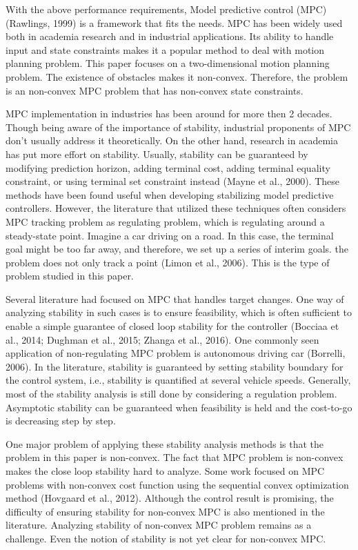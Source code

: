 \documentclass{ifacconf}
\begin{document}
With the above performance requirements, Model predictive control (MPC) (Rawlings, 1999) is a framework that fits the needs. MPC has been widely used both in academia research and in industrial applications. Its ability to handle input and state constraints makes it a popular method to deal with motion planning problem. 
This paper focuses on a two-dimensional motion planning problem. %
The existence of obstacles makes it non-convex. Therefore, the problem is an non-convex MPC problem that has non-convex state constraints. 

MPC implementation in industries has been around for more then 2 decades. Though being aware of the importance of stability, industrial proponents of MPC don't usually address it theoretically. On the other hand, research in academia has put more effort on stability. Usually, stability can be guaranteed by modifying prediction horizon, adding terminal cost, adding terminal equality constraint, or using terminal set constraint instead (Mayne et al., 2000). These methods have been found useful when developing stabilizing model predictive controllers. However, the literature that utilized these techniques often considers MPC tracking problem as regulating problem, which is regulating around a steady-state point. Imagine a car driving on a road. In this case, the terminal goal might be too far away, and therefore, we set up a series of interim goals. the problem does not only track a point (Limon et al., 2006). This is the type of problem studied in this paper.

Several literature had focused on MPC that handles target changes. One way of analyzing stability in such cases is to ensure feasibility, which is often sufficient to enable a simple guarantee of closed loop stability for the controller (Bocciaa et al., 2014; Dughman et al., 2015; Zhanga et al., 2016). One commonly seen application of non-regulating MPC problem is autonomous driving car (Borrelli, 2006). In the literature, stability is guaranteed by setting stability boundary for the control system, i.e., stability is quantified at several vehicle speeds. Generally, most of the stability analysis is still done by considering a regulation problem. Asymptotic stability can be guaranteed when feasibility is held and the cost-to-go is decreasing step by step.

One major problem of applying these stability analysis methods is that the problem in this paper is non-convex. The fact that MPC problem is non-convex makes the close loop stability hard to analyze. Some work focused on MPC problems with non-convex cost function using the sequential convex optimization method (Hovgaard et al., 2012). Although the control result is promising, the difficulty of ensuring stability for non-convex MPC is also mentioned in the literature. 
Analyzing stability of non-convex MPC problem remains as a challenge. Even the notion of stability is not yet clear for non-convex MPC.
\end{document}
